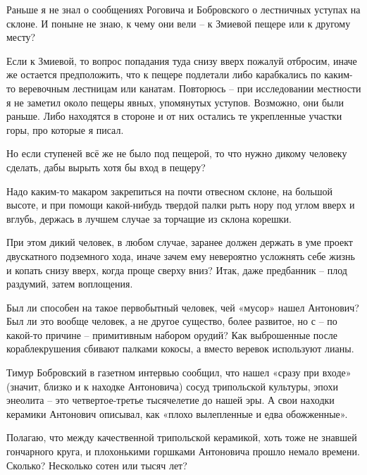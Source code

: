 Раньше я не знал о сообщениях Роговича и Бобровского о лестничных уступах на склоне. И поныне не знаю, к чему они вели – к Змиевой пещере или к другому месту? 

Если к Змиевой, то вопрос попадания туда снизу вверх пожалуй отбросим, иначе же остается предположить, что к пещере подлетали либо карабкались по каким-то веревочным лестницам или канатам. Повторюсь – при исследовании местности я не заметил около пещеры явных, упомянутых уступов. Возможно, они были раньше. Либо находятся в стороне и от них остались те укрепленные участки горы, про которые я писал.

Но если ступеней всё же не было под пещерой, то что нужно дикому человеку сделать, дабы вырыть хотя бы вход в пещеру? 

Надо каким-то макаром закрепиться на почти отвесном склоне, на большой высоте, и при помощи какой-нибудь твердой палки рыть нору под углом вверх и вглубь, держась в лучшем случае за торчащие из склона корешки.

При этом дикий человек, в любом случае, заранее должен держать в уме проект двускатного подземного хода, иначе зачем ему невероятно усложнять себе жизнь и копать снизу вверх, когда проще сверху вниз? Итак, даже предбанник – плод раздумий, затем воплощения.

Был ли способен на такое первобытный человек, чей «мусор» нашел Антонович? Был ли это вообще человек, а не другое существо, более развитое, но с – по какой-то причине – примитивным набором орудий? Как выброшенные после кораблекрушения сбивают палками кокосы, а вместо веревок используют лианы.



Тимур Бобровский в газетном интервью сообщил, что нашел «сразу при входе» (значит, близко и к находке Антоновича) сосуд трипольской культуры, эпохи энеолита – это четвертое-третье тысячелетие до нашей эры. А свои находки керамики Антонович описывал, как «плохо вылепленные и едва обожженные». 

Полагаю, что между качественной трипольской керамикой, хоть тоже не знавшей гончарного круга, и плохонькими горшками Антоновича прошло немало времени. Сколько? Несколько сотен или тысяч лет?

